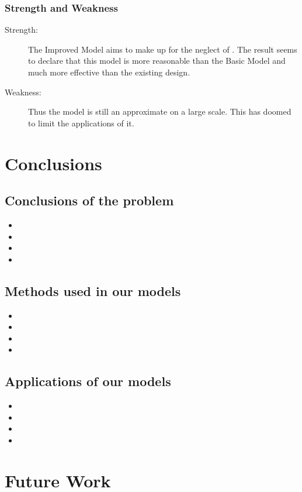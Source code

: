 \documentclass{apmcmthesis}
\begin{document}
\subsubsection{Strength and Weakness}

\begin{description}
  \item[Strength:] The Improved Model aims to make up for the neglect of         . The result seems to declare that this model is more reasonable than the Basic Model and much more effective than the existing design.
  \item[Weakness:] Thus the model is still an approximate on a large scale. This has doomed to limit the applications of it.
\end{description}

\section{Conclusions}

\subsection{Conclusions of the problem}
\begin{itemize}
  \item
  \item
  \item
  \item
\end{itemize}
\subsection{Methods used in our models}
\begin{itemize}
  \item
  \item
  \item
  \item
\end{itemize}
\subsection{Applications of our models}
\begin{itemize}
  \item
  \item
  \item
  \item
\end{itemize}
\section{Future Work}
\end{document}

